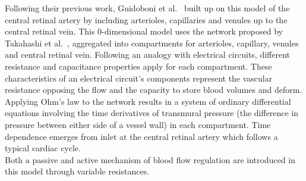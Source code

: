 \documentclass[12pt,a4paper]{journal}
\begin{document}
Following their previous work, Guidoboni et al.~\cite{Guidoboni_2014a} built up on this model of the central retinal artery by including arterioles, capillaries and venules up to the central retinal vein.
This 0-dimensional model uses the network proposed by Takahashi et al.~\cite{Takahashi_2009}, aggregated into compartments for arterioles, capillary, venules and central retinal vein.
Following an analogy with electrical circuits, different resistance and capacitance properties apply for each compartment.
These characteristics of an electrical circuit's components represent the vascular resistance opposing the flow and the capacity to store blood volumes and deform.
Applying Ohm's law to the network results in a system of ordinary differential equations involving the time derivatives of transmural pressure (the difference in pressure between either side of a vessel wall) in each compartment.
Time dependence emerges from inlet at the central retinal artery which follows a typical cardiac cycle.\\
Both a passive and active mechanism of blood flow regulation are introduced in this model through variable resistances.
\end{document}
